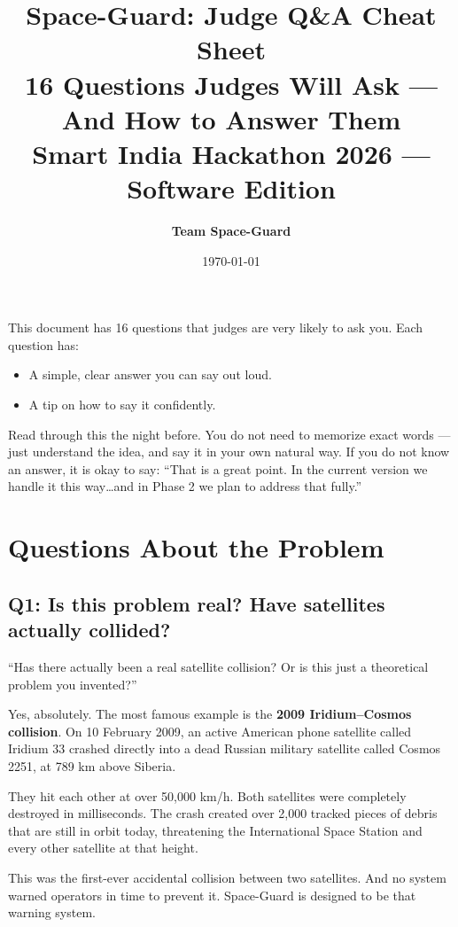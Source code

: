 \documentclass[11pt,a4paper]{article}
\title{\Huge \textbf{Space-Guard: Judge Q\&A Cheat Sheet}\\[0.4em]
\Large \textbf{16 Questions Judges Will Ask --- And How to Answer Them}\\[0.5em]
\large \textbf{Smart India Hackathon 2026 --- Software Edition}}
\author{\textbf{Team Space-Guard}}
\date{\today}
\begin{document}
\maketitle
\thispagestyle{empty}

\begin{tcolorbox}[colback=green!5!white,colframe=green!60!black,title=\textbf{How to Use This Guide}]
This document has 16 questions that judges are very likely to ask you. Each question has:
\begin{itemize}
    \item A simple, clear answer you can say out loud.
    \item A tip on how to say it confidently.
\end{itemize}
Read through this the night before. You do not need to memorize exact words --- just understand the idea, and say it in your own natural way. If you do not know an answer, it is okay to say: ``That is a great point. In the current version we handle it this way\ldots and in Phase 2 we plan to address that fully.''
\end{tcolorbox}

\vspace{1em}
\tableofcontents
\newpage

\section{Questions About the Problem}

\subsection*{Q1: Is this problem real? Have satellites actually collided?}

\begin{questionbox}
``Has there actually been a real satellite collision? Or is this just a theoretical problem you invented?''
\end{questionbox}

\begin{answerbox}
Yes, absolutely. The most famous example is the \textbf{2009 Iridium--Cosmos collision}. On 10 February 2009, an active American phone satellite called Iridium 33 crashed directly into a dead Russian military satellite called Cosmos 2251, at 789 km above Siberia.

They hit each other at over 50,000 km/h. Both satellites were completely destroyed in milliseconds. The crash created over 2,000 tracked pieces of debris that are still in orbit today, threatening the International Space Station and every other satellite at that height.

This was the first-ever accidental collision between two satellites. And no system warned operators in time to prevent it. Space-Guard is designed to be that warning system.
\end{answerbox}
\end{document}
